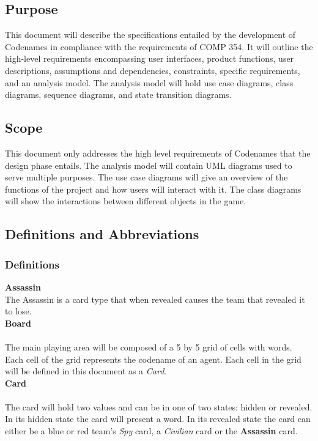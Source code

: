 \documentclass[10pt, a4paper]{article}
\begin{document}
	\subsection{Purpose}
	
	This document will describe the specifications entailed by the development of Codenames in compliance with the requirements of COMP 354. It will outline the high-level requirements encompassing user interfaces, product functions, user descriptions, assumptions and dependencies, constraints, specific requirements, and an analysis model. The analysis model will hold use case diagrams, class diagrams, sequence diagrams, and state transition diagrams.
	
	\subsection{Scope}
	
	This document only addresses the high level requirements of Codenames that the design phase entails. The analysis model will contain UML diagrams used to serve multiple purposes. The use case diagrams will give an overview of the functions of the project and how users will interact with it. The class diagrams will show the interactions between different objects in the game. \\
	

	\subsection{Definitions and Abbreviations}
	
		\subsubsection{Definitions}
		\textbf{Assassin} \\
		The Assassin is a card type that when revealed causes the team that revealed it to lose.\\
	
		\textbf{Board} \\
		\\
		The main playing area will be composed of a 5 by 5 grid of cells with words. Each cell of the grid represents the codename of an agent. Each cell in the grid will be defined in this document as a \textit{Card}.\\
	
		\textbf{Card} \\
		\\
		The card will hold two values and can be in one of two states: hidden or revealed. In its hidden state the card will present a word. In its revealed state the card can either be a blue or red team's \textit{Spy} card, a \textit{Civilian} card or the \textbf{Assassin} card.\\
		
\end{document}
